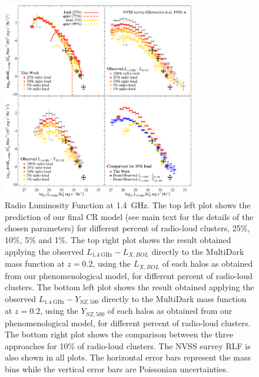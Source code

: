 \documentclass[traditabstract]{aa}
\newcommand{\rmn}{\mathrm}
\begin{document}
\begin{figure}[hbt!]
\centering
\includegraphics[width=0.75\textwidth]{figures/RLFs_1.4.eps}
\caption{Radio Luminosity Function at 1.4~GHz. The top left plot shows the prediction of our final CR model (see main text for the details of the chosen parameters) for different percent of radio-loud clusters, 25\%, 10\%, 5\% and 1\%. The top right plot shows the result obtained applying the observed $L_{1.4~\rmn{GHz}}-L_{X, BOL}$ directly to the MultiDark mass function at  $z = 0.2$, using the $L_{X, BOL}$ of each halos as obtained from our phenomenological model, for different percent of radio-loud clusters. The bottom left plot shows the result obtained applying the observed $L_{1.4~\rmn{GHz}}-Y_{SZ, 500}$ directly to the MultiDark mass function at  $z = 0.2$,  using the $Y_{SZ, 500}$ of each halos as obtained from our phenomenological model, for different percent of radio-loud clusters. The bottom right plot shows the comparison between the three approaches for 10\% of radio-loud clusters. The NVSS survey RLF \citep{1999NewA....4..141G} is also shown in all plots. The horizontal error bars represent the mass bins while the vertical error bars are Poissonian uncertainties.}
\label{fig:RLF_1.4}
\end{figure}
\end{document}
